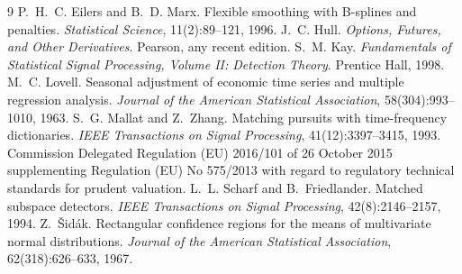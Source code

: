 \begin{thebibliography}{9}
 P.~H.~C. Eilers and B.~D. Marx. Flexible smoothing with B-splines and penalties.
\emph{Statistical Science}, 11(2):89--121, 1996.
 J.~C. Hull. \emph{Options, Futures, and Other Derivatives}. Pearson, any recent edition.
 S.~M. Kay. \emph{Fundamentals of Statistical Signal Processing, Volume II: Detection Theory}.
Prentice Hall, 1998.
 M.~C. Lovell. Seasonal adjustment of economic time series and multiple regression analysis.
\emph{Journal of the American Statistical Association}, 58(304):993--1010, 1963.
 S.~G. Mallat and Z.~Zhang. Matching pursuits with time-frequency dictionaries.
\emph{IEEE Transactions on Signal Processing}, 41(12):3397--3415, 1993.
 Commission Delegated Regulation (EU) 2016/101 of 26 October 2015 supplementing Regulation (EU)
No 575/2013 with regard to regulatory technical standards for prudent valuation.
 L.~L. Scharf and B.~Friedlander. Matched subspace detectors. \emph{IEEE Transactions on Signal
Processing}, 42(8):2146--2157, 1994.
 Z.~Šidák. Rectangular confidence regions for the means of multivariate normal distributions.
\emph{Journal of the American Statistical Association}, 62(318):626--633, 1967.
\end{thebibliography}
